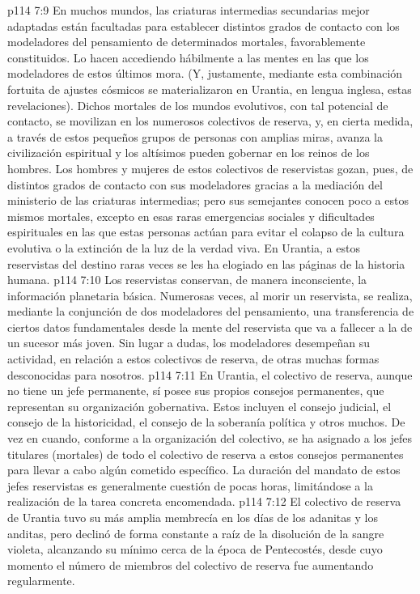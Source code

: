 \vs p114 7:9 En muchos mundos, las criaturas intermedias secundarias mejor adaptadas están facultadas para establecer distintos grados de contacto con los modeladores del pensamiento de determinados mortales, favorablemente constituidos. Lo hacen accediendo hábilmente a las mentes en las que los modeladores de estos últimos mora. (Y, justamente, mediante esta combinación fortuita de ajustes cósmicos se materializaron en Urantia, en lengua inglesa, estas revelaciones). Dichos mortales de los mundos evolutivos, con tal potencial de contacto, se movilizan en los numerosos colectivos de reserva, y, en cierta medida, a través de estos pequeños grupos de personas con amplias miras, avanza la civilización espiritual y los altísimos pueden gobernar en los reinos de los hombres. Los hombres y mujeres de estos colectivos de reservistas gozan, pues, de distintos grados de contacto con sus modeladores gracias a la mediación del ministerio de las criaturas intermedias; pero sus semejantes conocen poco a estos mismos mortales, excepto en esas raras emergencias sociales y dificultades espirituales en las que estas personas actúan para evitar el colapso de la cultura evolutiva o la extinción de la luz de la verdad viva. En Urantia, a estos reservistas del destino raras veces se les ha elogiado en las páginas de la historia humana.
\vs p114 7:10 Los reservistas conservan, de manera inconsciente, la información planetaria básica. Numerosas veces, al morir un reservista, se realiza, mediante la conjunción de dos modeladores del pensamiento, una transferencia de ciertos datos fundamentales desde la mente del reservista que va a fallecer a la de un sucesor más joven. Sin lugar a dudas, los modeladores desempeñan su actividad, en relación a estos colectivos de reserva, de otras muchas formas desconocidas para nosotros.
\vs p114 7:11 En Urantia, el colectivo de reserva, aunque no tiene un jefe permanente, sí posee sus propios consejos permanentes, que representan su organización gobernativa. Estos incluyen el consejo judicial, el consejo de la historicidad, el consejo de la soberanía política y otros muchos. De vez en cuando, conforme a la organización del colectivo, se ha asignado a los jefes titulares (mortales) de todo el colectivo de reserva a estos consejos permanentes para llevar a cabo algún cometido específico. La duración del mandato de estos jefes reservistas es generalmente cuestión de pocas horas, limitándose a la realización de la tarea concreta encomendada.
\vs p114 7:12 El colectivo de reserva de Urantia tuvo su más amplia membrecía en los días de los adanitas y los anditas, pero declinó de forma constante a raíz de la disolución de la sangre violeta, alcanzando su mínimo cerca de la época de Pentecostés, desde cuyo momento el número de miembros del colectivo de reserva fue aumentando regularmente.
